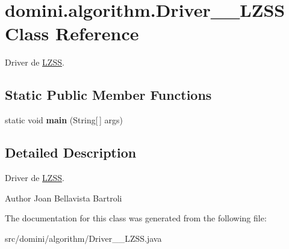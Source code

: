 \hypertarget{classdomini_1_1algorithm_1_1Driver____LZSS}{}\section{domini.\+algorithm.\+Driver\+\_\+\+\_\+\+L\+Z\+SS Class Reference}
\label{classdomini_1_1algorithm_1_1Driver____LZSS}


Driver de \hyperlink{classdomini_1_1algorithm_1_1LZSS}{L\+Z\+SS}.  


\subsection*{Static Public Member Functions}
\begin{DoxyCompactItemize}
\item 
\mbox{\label{classdomini_1_1algorithm_1_1Driver____LZSS_ac1b8e15e184e7372a5ad2a76ac3b5d8c}} 
static void {\bfseries main} (String\mbox{[}$\,$\mbox{]} args)
\end{DoxyCompactItemize}


\subsection{Detailed Description}
Driver de \hyperlink{classdomini_1_1algorithm_1_1LZSS}{L\+Z\+SS}. 

\begin{DoxyAuthor}{Author}
Joan Bellavista Bartroli 
\end{DoxyAuthor}


The documentation for this class was generated from the following file\+:\begin{DoxyCompactItemize}
\item 
src/domini/algorithm/Driver\+\_\+\+\_\+\+L\+Z\+S\+S.\+java\end{DoxyCompactItemize}
